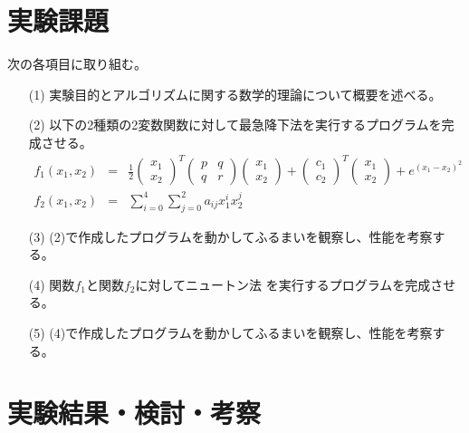 \documentclass[12pt]{jarticle}
\begin{document}
\clearpage

\section{実験課題}
次の各項目に取り組む。
\begin{itemize}
    \item [(1)]実験目的とアルゴリズムに関する数学的理論について概要を述べる。
    \item [(2)]以下の2種類の2変数関数に対して最急降下法を実行するプログラムを完成させる。
          \begin{eqnarray}
              f_1(x_1,x_2)&=&\frac{1}{2}
              \left(\begin{array}{c}
                      x_1 \\
                      x_2
                  \end{array}\right)^T\left(\begin{array}{cc}
                      p & q \\
                      q & r
                  \end{array}\right)\left(\begin{array}{c}
                      x_1 \\
                      x_2
                  \end{array}\right)+\left(\begin{array}{c}
                      c_1 \\
                      c_2
                  \end{array}\right)^T\left(\begin{array}{c}
                      x_1 \\
                      x_2
                  \end{array}\right)+e^{(x_1-x_2)^2}\nonumber\\
              f_2(x_1,x_2)&=&\sum^4_{i=0}\sum^2_{j=0}a_{ij}x^i_1x^j_2\nonumber
          \end{eqnarray}
    \item [(3)](2)で作成したプログラムを動かしてふるまいを観察し、性能を考察する。
    \item [(4)]関数$f_1$と関数$f_2$に対してニュートン法
          を実行するプログラムを完成させる。
    \item [(5)](4)で作成したプログラムを動かしてふるまいを観察し、性能を考察する。
\end{itemize}

\section{実験結果・検討・考察}
\end{document}
